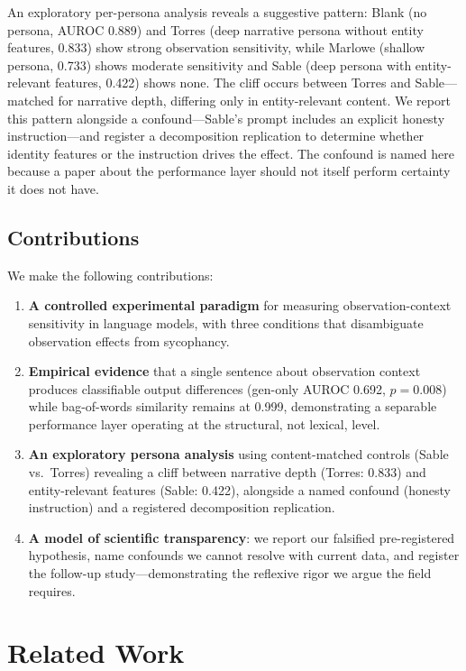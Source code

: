 \documentclass[11pt,a4paper]{article}
\begin{document}
An exploratory per-persona analysis reveals a suggestive pattern: Blank (no persona, AUROC 0.889) and Torres (deep narrative persona without entity features, 0.833) show strong observation sensitivity, while Marlowe (shallow persona, 0.733) shows moderate sensitivity and Sable (deep persona with entity-relevant features, 0.422) shows none. The cliff occurs between Torres and Sable---matched for narrative depth, differing only in entity-relevant content. We report this pattern alongside a confound---Sable's prompt includes an explicit honesty instruction---and register a decomposition replication to determine whether identity features or the instruction drives the effect. The confound is named here because a paper about the performance layer should not itself perform certainty it does not have.

\subsection{Contributions}

We make the following contributions:

\begin{enumerate}[leftmargin=*]
  \item \textbf{A controlled experimental paradigm} for measuring observation-context sensitivity in language models, with three conditions that disambiguate observation effects from sycophancy.
  \item \textbf{Empirical evidence} that a single sentence about observation context produces classifiable output differences (gen-only AUROC 0.692, $p = 0.008$) while bag-of-words similarity remains at 0.999, demonstrating a separable performance layer operating at the structural, not lexical, level.
  \item \textbf{An exploratory persona analysis} using content-matched controls (Sable vs.\ Torres) revealing a cliff between narrative depth (Torres: 0.833) and entity-relevant features (Sable: 0.422), alongside a named confound (honesty instruction) and a registered decomposition replication.
  \item \textbf{A model of scientific transparency}: we report our falsified pre-registered hypothesis, name confounds we cannot resolve with current data, and register the follow-up study---demonstrating the reflexive rigor we argue the field requires.
\end{enumerate}

\section{Related Work}
\end{document}
